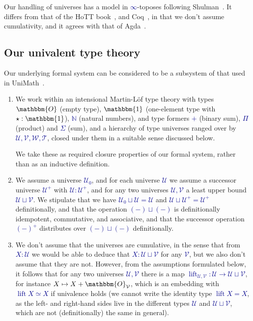 \documentclass[10pt]{article}
\newcommand{\db}{\textcolor{darkblue}}
\newcommand{\m}[1]{\db{$#1$}}
\newcommand{\lift}{\operatorname{lift}}
\newcommand{\N}{\mathbb{N}}
\newcommand{\U}{\mathcal{U}}
\newcommand{\V}{\mathcal{V}}
\newcommand{\W}{\mathcal{W}}
\newcommand{\T}{\mathcal{T}}
\newcommand{\Zero}{\mathbbm{O}}
\newcommand{\One}{\mathbbm{1}}
\newcommand{\one}{\operatorname{\star}}
\theoremstyle{definition}
\begin{document}
Our handling of universes has a model in \m{\infty}-toposes following
Shulman~\cite{2019arXiv190407004S}. It differs from that of the HoTT
book~\cite{hottbook}, and Coq~\cite{coq}, in that we don't assume
cumulativity, and it agrees with that of Agda~\cite{agda}.

\subsection{Our univalent type theory}

Our underlying formal system can be considered to be a subsystem of that
used in UniMath~\cite{unimath}.
\begin{enumerate}
\item We work within an intensional Martin-L\"of type theory with
  types \m{\Zero} (empty type), \m{\One} (one-element type with
  \m{\one:\One}), \m{\N} (natural numbers), and type formers \m{+}
  (binary sum), \m{\Pi} (product) and \m{\Sigma} (sum), and a
  hierarchy of type universes ranged over by \m{\U,\V,\W,\T}, closed
  under them in a suitable sense discussed below.

  We take these as required closure properties of our formal system,
  rather than as an inductive definition.

\item We assume a universe \m{\U_0}, and for each universe \m{\U} we
  assume a successor universe \m{\U^+} with \m{\U : \U^+}, and for any
  two universes \m{\U,\V} a least upper bound \m{\U \sqcup \V}. We
  stipulate that we have \m{\U_0 \sqcup \U = \U} and \m{\U \sqcup \U^+
    = \U^+} definitionally, and that the operation \m{(-)\sqcup(-)} is
  definitionally idempotent, commutative, and associative, and that
  the successor operation \m{(-)^+} distributes over \m{(-)\sqcup(-)}
  definitionally.

\item We don't assume that the universes are cumulative, in the sense
  that from \m{X : \U} we would be able to deduce that
  \m{X : \U \sqcup \V} for any \m{\V}, but we also don't assume that they
  are not. However, from the assumptions formulated below, it follows
  that for any two universes \m{\U,\V} there is a map
  \m{\lift_{\U,\V} : \U \to \U \sqcup \V}, for instance
  \m{X \mapsto X + \Zero_\V}, which is an embedding with
  \m{\lift X \simeq X} if univalence holds (we cannot write the identity
  type \m{\lift X = X}, as the left- and right-hand sides live in the different
  types \m{\U} and \m{\U \sqcup \V}, which are not (definitionally) the
  same in general).


\end{enumerate}
\end{document}
